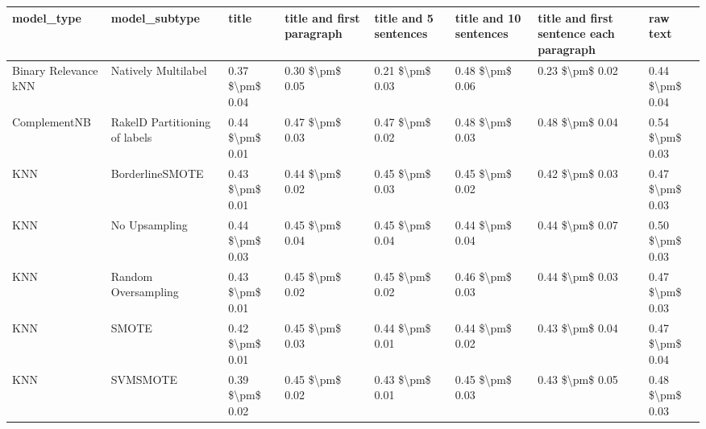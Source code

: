 \begin{tabular}{llllllll}
\toprule
                     model\_type &                 model\_subtype &           title & title and first paragraph & title and 5 sentences & title and 10 sentences & title and first sentence each paragraph &            raw text \\
\midrule
           Binary Relevance kNN &           Natively Multilabel & 0.37 \$\textbackslash pm\$ 0.04 &           0.30 \$\textbackslash pm\$ 0.05 &       0.21 \$\textbackslash pm\$ 0.03 &        0.48 \$\textbackslash pm\$ 0.06 &                         0.23 \$\textbackslash pm\$ 0.02 &     0.44 \$\textbackslash pm\$ 0.04 \\
                   ComplementNB & RakelD Partitioning of labels & 0.44 \$\textbackslash pm\$ 0.01 &           0.47 \$\textbackslash pm\$ 0.03 &       0.47 \$\textbackslash pm\$ 0.02 &        0.48 \$\textbackslash pm\$ 0.03 &                         0.48 \$\textbackslash pm\$ 0.04 &     0.54 \$\textbackslash pm\$ 0.03 \\
                            KNN &               BorderlineSMOTE & 0.43 \$\textbackslash pm\$ 0.01 &           0.44 \$\textbackslash pm\$ 0.02 &       0.45 \$\textbackslash pm\$ 0.03 &        0.45 \$\textbackslash pm\$ 0.02 &                         0.42 \$\textbackslash pm\$ 0.03 &     0.47 \$\textbackslash pm\$ 0.03 \\
                            KNN &                 No Upsampling & 0.44 \$\textbackslash pm\$ 0.03 &           0.45 \$\textbackslash pm\$ 0.04 &       0.45 \$\textbackslash pm\$ 0.04 &        0.44 \$\textbackslash pm\$ 0.04 &                         0.44 \$\textbackslash pm\$ 0.07 &     0.50 \$\textbackslash pm\$ 0.03 \\
                            KNN &           Random Oversampling & 0.43 \$\textbackslash pm\$ 0.01 &           0.45 \$\textbackslash pm\$ 0.02 &       0.45 \$\textbackslash pm\$ 0.02 &        0.46 \$\textbackslash pm\$ 0.03 &                         0.44 \$\textbackslash pm\$ 0.03 &     0.47 \$\textbackslash pm\$ 0.03 \\
                            KNN &                         SMOTE & 0.42 \$\textbackslash pm\$ 0.01 &           0.45 \$\textbackslash pm\$ 0.03 &       0.44 \$\textbackslash pm\$ 0.01 &        0.44 \$\textbackslash pm\$ 0.02 &                         0.43 \$\textbackslash pm\$ 0.04 &     0.47 \$\textbackslash pm\$ 0.04 \\
                            KNN &                      SVMSMOTE & 0.39 \$\textbackslash pm\$ 0.02 &           0.45 \$\textbackslash pm\$ 0.02 &       0.43 \$\textbackslash pm\$ 0.01 &        0.45 \$\textbackslash pm\$ 0.03 &                         0.43 \$\textbackslash pm\$ 0.05 &     0.48 \$\textbackslash pm\$ 0.03 \\

\end{tabular}
